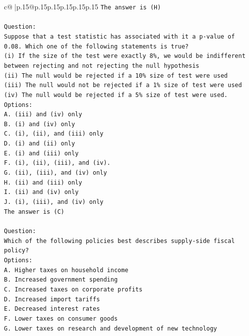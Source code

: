 \documentclass{article}
\begin{document}
{\begin{supertabular}{c@{$\;$}|p{.15\linewidth}@{}p{.15\linewidth}p{.15\linewidth}p{.15\linewidth}p{.15\linewidth}p{.15\linewidth}}
{{{\texttt{The answer is (H)} \\
\\ 
\texttt{Question:} \\
\texttt{Suppose that a test statistic has associated with it a p{-}value of 0.08. Which one of the following statements is true?} \\
\texttt{(i) If the size of the test were exactly 8\%, we would be indifferent between rejecting and not rejecting the null hypothesis} \\
\texttt{(ii) The null would be rejected if a 10\% size of test were used} \\
\texttt{(iii) The null would not be rejected if a 1\% size of test were used} \\
\texttt{(iv) The null would be rejected if a 5\% size of test were used.} \\
\texttt{Options:} \\
\texttt{A. (iii) and (iv) only} \\
\texttt{B. (i) and (iv) only} \\
\texttt{C. (i), (ii), and (iii) only} \\
\texttt{D. (i) and (ii) only} \\
\texttt{E. (i) and (iii) only} \\
\texttt{F. (i), (ii), (iii), and (iv).} \\
\texttt{G. (ii), (iii), and (iv) only} \\
\texttt{H. (ii) and (iii) only} \\
\texttt{I. (ii) and (iv) only} \\
\texttt{J. (i), (iii), and (iv) only} \\
\texttt{The answer is (C)} \\
\\ 
\texttt{Question:} \\
\texttt{Which of the following policies best describes supply{-}side fiscal policy?} \\
\texttt{Options:} \\
\texttt{A. Higher taxes on household income} \\
\texttt{B. Increased government spending} \\
\texttt{C. Increased taxes on corporate profits} \\
\texttt{D. Increased import tariffs} \\
\texttt{E. Decreased interest rates} \\
\texttt{F. Lower taxes on consumer goods} \\
\texttt{G. Lower taxes on research and development of new technology} \\
}}}
\end{supertabular}}
\end{document}
